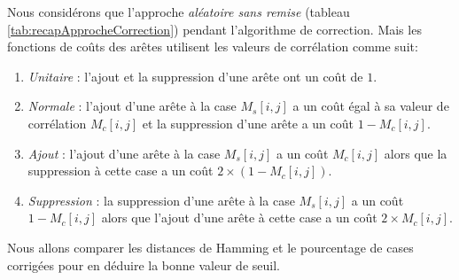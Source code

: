 Nous consid\'erons que l'approche {\em al\'eatoire sans remise} (tableau \ref{tab:recapApprocheCorrection}) pendant l'algorithme de correction. Mais les fonctions de co\^uts des ar\^etes utilisent les valeurs de corr\'elation comme suit:
\begin{enumerate} [label = (\alph*)]
\item {\em Unitaire} : l'ajout et la suppression d'une ar\^ete ont un co\^ut de $1$.
\item {\em Normale} : l'ajout d'une ar\^ete \`a la case $M_s[i,j]$ a un co\^ut \'egal \`a sa valeur de corr\'elation $M_c[i,j]$ et la suppression d'une ar\^ete a un  co\^ut $1-M_c[i,j]$.
\item {\em Ajout} : l'ajout d'une ar\^ete \`a la case $M_s[i,j]$ a un co\^ut $M_c[i,j]$ alors que la suppression \`a cette case a un co\^ut $2 \times (1-M_c[i,j])$.
\item {\em Suppression} : la suppression d'une ar\^ete \`a la case $M_s[i,j]$ a un co\^ut $1-M_c[i,j]$ alors que l'ajout d'une ar\^ete \`a cette case a un co\^ut $2 \times M_c[i,j]$.
\end{enumerate}
Nous allons comparer les distances de Hamming et le pourcentage de cases corrig\'ees pour en d\'eduire la bonne valeur de seuil.


